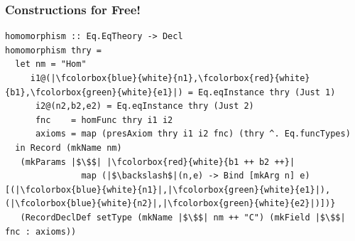 \documentclass[t,10pt,numbers,fleqn,usenames,xcolor=dvipsnames]{beamer}
\begin{document}
\begin{frame}[fragile]

\end{frame}

\begin{frame}[fragile] 
\frametitle{Constructions for Free!} 


\begin{overprint}
\begin{verbatim} 
homomorphism :: Eq.EqTheory -> Decl
homomorphism thry =
  let nm = "Hom" 
     i1@(|\fcolorbox{blue}{white}{n1},\fcolorbox{red}{white}{b1},\fcolorbox{green}{white}{e1}|) = Eq.eqInstance thry (Just 1)
      i2@(n2,b2,e2) = Eq.eqInstance thry (Just 2)
      fnc    = homFunc thry i1 i2
      axioms = map (presAxiom thry i1 i2 fnc) (thry ^. Eq.funcTypes)  
  in Record (mkName nm)
   (mkParams |$\$$| |\fcolorbox{red}{white}{b1 ++ b2 ++}|
               map (|$\backslash$|(n,e) -> Bind [mkArg n] e) [(|\fcolorbox{blue}{white}{n1}|,|\fcolorbox{green}{white}{e1}|),(|\fcolorbox{blue}{white}{n2}|,|\fcolorbox{green}{white}{e2}|)])}
   (RecordDeclDef setType (mkName |$\$$| nm ++ "C") (mkField |$\$$| fnc : axioms))
\end{verbatim} 
\end{overprint}
\end{frame}
\end{document}

